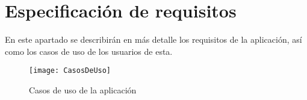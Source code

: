 

\section{Especificación de requisitos}
En este apartado se describirán en más detalle los requisitos de la aplicación, así como los casos de uso de los usuarios de esta.
\begin{landscape}
\newpage

	\begin{figure}[!h]
	\centering
	\texttt{[image: CasosDeUso]}
	\caption{Casos de uso de la aplicación}\label{CasosDeUso}
\end{figure}
\FloatBarrier

\end{landscape}


